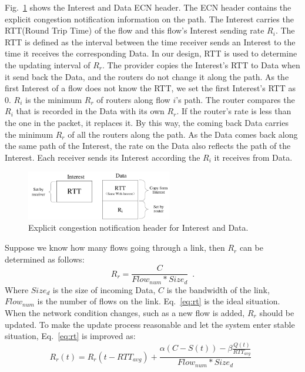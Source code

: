 Fig.~\ref{fig-header} shows the Interest and Data ECN header. The ECN header contains the explicit congestion notification information on the path. The Interest carries the RTT(Round Trip Time) of the flow and this flow's Interest sending rate $R_{i}$. The RTT is defined as the interval between the time receiver sends an Interest to the time it receives the corresponding Data. In our design, RTT is used to determine the updating interval of $R_{r}$. The provider copies the Interest's RTT to Data when it send back the Data, and the routers do not change it along the path. As the first Interest of a flow does not know the RTT, we set the first Interest's RTT as 0. $R_{i}$ is the minimum $R_{r}$ of routers along flow $i$'s path. The router compares the $R_{i}$ that is recorded in the Data with its own $R_{r}$. If the router's rate is less than the one in the packet, it replaces it. By this way, the coming back Data carries the minimum $R_{r}$ of all the routers along the path. As the Data comes back along the same path of the Interest, the rate on the Data also reflects the path of the Interest. Each receiver sends its Interest according the $R_{i}$ it receives from Data.

\begin{figure}[t]
	\centering
	\includegraphics[width=2.5in]{header-ndn.pdf}
	\caption{Explicit congestion notification header for Interest and Data.}
	\label{fig-header}
\end{figure}

Suppose we know how many flows going through a link, then $R_{r}$ can be determined as follows:
\begin{equation}
	\label{eq:rt}
	R_{r}=\frac{C}{Flow_{num}*Size_{d}} \enspace .
\end{equation}
Where $Size_{d}$ is the size of incoming Data, $C$ is the bandwidth of the link, $Flow_{num}$ is the number of flows on the link. Eq.~\ref{eq:rt} is the ideal situation. When the network condition changes, such as a new flow is added, $R_{r}$ should be updated. To make the update process reasonable and let the system enter stable situation, Eq.~\ref{eq:rt} is improved as:
\begin{equation}
	\label{eq:updated_rt}
	R_{r}(t)=R_{r}(t-RTT_{avg})+\frac{\alpha(C-S(t))-\beta\frac{Q(t)}{RTT_{avg}}}{Flow_{num}*Size_{d}} \enspace
\end{equation}

